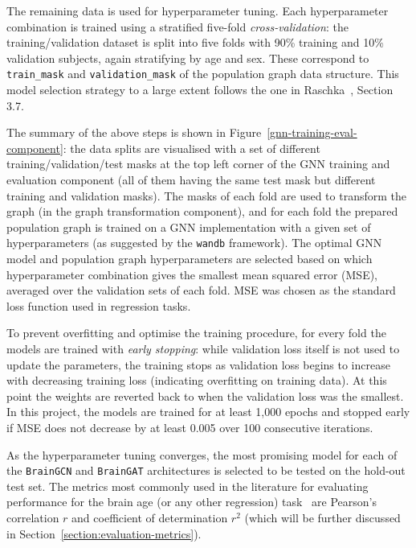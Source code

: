 The remaining data is used for hyperparameter tuning. Each hyperparameter combination is trained using a stratified five-fold \textit{cross-validation}: the training/validation dataset is split into five folds with 90\% training and 10\% validation subjects, again stratifying by age and sex. These correspond to \texttt{train\_mask} and \texttt{validation\_mask} of the population graph data structure. This model selection strategy to a large extent follows the one in Raschka~\cite{raschka2018model}, Section 3.7.

The summary of the above steps is shown in Figure~\ref{gnn-training-eval-component}: the data splits are visualised with a set of different training/validation/test masks at the top left corner of the GNN training and evaluation component (all of them having the same test mask but different training and validation masks). The masks of each fold are used to transform the graph (in the graph transformation component), and for each fold the prepared population graph is trained on a GNN implementation with a given set of hyperparameters (as suggested by the \texttt{wandb} framework). The optimal GNN model and population graph hyperparameters are selected based on which hyperparameter combination gives the smallest mean squared error (MSE), averaged over the validation sets of each fold. MSE was chosen as the standard loss function used in regression tasks.

To prevent overfitting and optimise the training procedure, for every fold the models are trained with \textit{early stopping}: while validation loss itself is not used to update the parameters, the training stops as validation loss begins to increase with decreasing training loss (indicating overfitting on training data). At this point the weights are reverted back to when the validation loss was the smallest. In this project, the models are trained for at least 1,000 epochs and stopped early if MSE does not decrease by at least 0.005 over 100 consecutive iterations. 

As the hyperparameter tuning converges, the most promising model for each of the \texttt{BrainGCN} and \texttt{BrainGAT} architectures is selected to be tested on the hold-out test set. The metrics most commonly used in the literature for evaluating performance for the brain age (or any other regression) task~\cite{pervaiz2020optimising, niu2019improved} are Pearson's correlation $r$ and coefficient of determination $r^2$ (which will be further discussed in Section~\ref{section:evaluation-metrics}).

